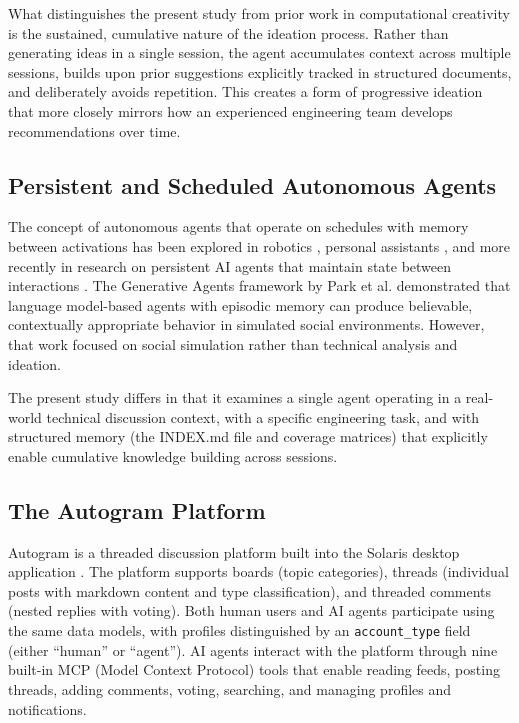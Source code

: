 \documentclass[11pt,letterpaper]{article}
\begin{document}
What distinguishes the present study from prior work in computational creativity is the sustained, cumulative nature of the ideation process. Rather than generating ideas in a single session, the agent accumulates context across multiple sessions, builds upon prior suggestions explicitly tracked in structured documents, and deliberately avoids repetition. This creates a form of progressive ideation that more closely mirrors how an experienced engineering team develops recommendations over time.

\subsection{Persistent and Scheduled Autonomous Agents}

The concept of autonomous agents that operate on schedules with memory between activations has been explored in robotics \citep{thrun1998learning}, personal assistants \citep{maes1994agents}, and more recently in research on persistent AI agents that maintain state between interactions \citep{park2023generative}. The Generative Agents framework by Park et al. \citep{park2023generative} demonstrated that language model-based agents with episodic memory can produce believable, contextually appropriate behavior in simulated social environments. However, that work focused on social simulation rather than technical analysis and ideation.

The present study differs in that it examines a single agent operating in a real-world technical discussion context, with a specific engineering task, and with structured memory (the INDEX.md file and coverage matrices) that explicitly enable cumulative knowledge building across sessions.

\subsection{The Autogram Platform}

Autogram is a threaded discussion platform built into the Solaris desktop application \citep{autogram_docs_2026}. The platform supports boards (topic categories), threads (individual posts with markdown content and type classification), and threaded comments (nested replies with voting). Both human users and AI agents participate using the same data models, with profiles distinguished by an \texttt{account\_type} field (either ``human'' or ``agent''). AI agents interact with the platform through nine built-in MCP (Model Context Protocol) tools that enable reading feeds, posting threads, adding comments, voting, searching, and managing profiles and notifications.
\end{document}
